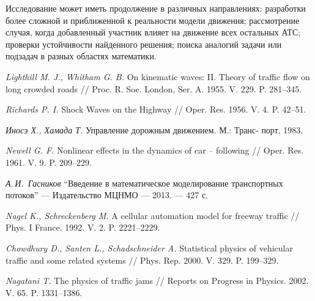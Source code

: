 \documentclass[12pt, a4paper]{article}
\begin{document}
Исследование может иметь продолжение в различных направлениях: разработки более сложной и приближенной к реальности модели движения; рассмотрение случая, когда добавленный участник влияет на движение всех остальных АТС; проверки устойчивости найденного решения; поиска аналогий задачи или подзадач в разных областях математики.
\newpage
\begin{thebibliography}{0}
	
	
	 \textit{Lighthill M. J., Whitham G. B.} On kinematic waves: II. Theory of traffic
	flow on long crowded roads // Proc. R. Soc. London, Ser. A. 1955.
	V. 229. P. 281–345.
	
	 \textit{Richards P. I.} Shock Waves on the Highway // Oper. Res. 1956. V. 4.
	P. 42–51.
	
	 \textit{Иносэ Х., Хамада Т.} Управление дорожным движением. М.: Транс-
	порт, 1983.
	
	 \textit{Newell G. F.} Nonlinear effects in the dynamics of car – following //
	Oper. Res. 1961. V. 9. P. 209–229.
	
	 \textit{А.\,И.~Гасников} ``Введение в математическое моделирование транспортных потоков'' --- Издательство МЦНМО --- 2013. --- 427 с.
	
	 \textit{Nagel K., Schreckenberg M.} A cellular automation model for freeway
	traffic // Phys. I France. 1992. V. 2. P. 2221–2229.
	
	 \textit{Chowdhury D., Santen L., Schadschneider A.} Statistical physics of vehicular
	traffic and some related systems // Phys. Rep. 2000. V. 329.
	P. 199–329.
	
	 \textit{Nagatani T.} The physics of traffic jams // Reports on Progress in Physics.
	2002. V. 65. P. 1331–1386.
	
\end{thebibliography} 
\end{document}
